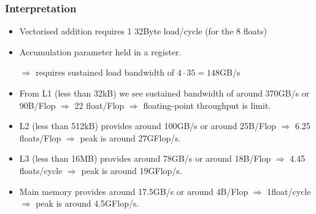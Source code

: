 \documentclass[dvipsnames,presentation,aspectratio=169,14pt]{beamer}
\begin{document}
\begin{frame}
\begin{center}
  \end{center}
\end{frame}


\begin{frame}
  \frametitle{Interpretation}
  \small
  \begin{itemize}
  \item Vectorised addition requires 1 32Byte load/cycle (for the 8
    floats)
  \item Accumulation parameter held in a register.
  \item[$\Rightarrow$] requires sustained load bandwidth of $4 \cdot 35 = 148$GB/s

  \item From L1 (less than 32kB) we see sustained bandwidth of around
    370GB/s or 90B/Flop $\Rightarrow$ 22 float/Flop  $\Rightarrow$
    floating-point throughput is limit.

  \item L2 (less than 512kB) provides around 100GB/s or around
    25B/Flop $\Rightarrow$ 6.25 floats/Flop $\Rightarrow$ peak
    is around 27GFlop/s.

  \item L3 (less than 16MB) provides around 78GB/s or around
    18B/Flop $\Rightarrow$ 4.45 floats/cycle $\Rightarrow$ peak
    is around 19GFlop/s.

  \item Main memory provides around 17.5GB/s or around 4B/Flop
    $\Rightarrow$ 1float/cycle $\Rightarrow$ peak is around 4.5GFlop/s.

  \end{itemize}
\end{frame}
\end{document}
